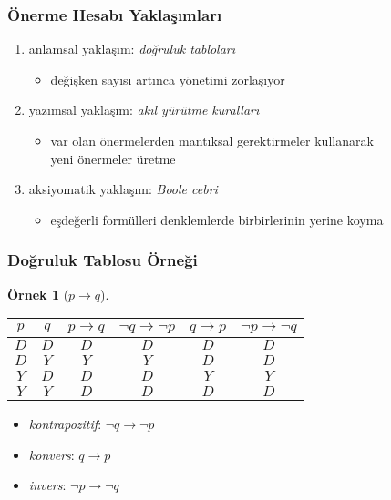 \documentclass[dvipsnames]{beamer}
\theoremstyle{definition}
\theoremstyle{example}
\newtheorem{ornek}[theorem]{Örnek}
\theoremstyle{plain}
\begin{document}
\begin{frame}
  \frametitle{Önerme Hesabı Yaklaşımları}

  \begin{enumerate}
    \item anlamsal yaklaşım: \emph{doğruluk tabloları}
    \begin{itemize}
      \item değişken sayısı artınca yönetimi zorlaşıyor
    \end{itemize}

    \pause
    \item yazımsal yaklaşım: \emph{akıl yürütme kuralları}
    \begin{itemize}
      \item var olan önermelerden mantıksal gerektirmeler kullanarak\\
        yeni önermeler üretme
    \end{itemize}

    \pause
    \item aksiyomatik yaklaşım: \emph{Boole cebri}
    \begin{itemize}
      \item eşdeğerli formülleri denklemlerde birbirlerinin yerine koyma
    \end{itemize}
  \end{enumerate}
\end{frame}

\begin{frame}
  \frametitle{Doğruluk Tablosu Örneği}

  \begin{ornek}[$p \rightarrow q$]
    \begin{center}
      \begin{tabular}{|c|c||c|c|c|c|}\hline
        $p$ & $q$ & $p \rightarrow q$ & $\neg q \rightarrow \neg p$
            & $q \rightarrow p$ & $\neg p \rightarrow \neg q$\\\hline\hline
        $D$ & $D$ & $D$ & $D$ & $D$ & $D$\\\hline
        $D$ & $Y$ & $Y$ & $Y$ & $D$ & $D$\\\hline
        $Y$ & $D$ & $D$ & $D$ & $Y$ & $Y$\\\hline
        $Y$ & $Y$ & $D$ & $D$ & $D$ & $D$\\\hline
      \end{tabular}
    \end{center}

    \pause
    \begin{itemize}
      \item \emph{kontrapozitif}: $\neg q \rightarrow \neg p$

      \pause
      \item \emph{konvers}: $q \rightarrow p$

      \pause
      \item \emph{invers}: $\neg p \rightarrow \neg q$
    \end{itemize}
  \end{ornek}
\end{frame}
\end{document}
